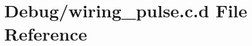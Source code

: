 \hypertarget{_debug_2wiring__pulse_8c_8d}{\section{\-Debug/wiring\-\_\-pulse.c.\-d \-File \-Reference}
\label{_debug_2wiring__pulse_8c_8d}
}

